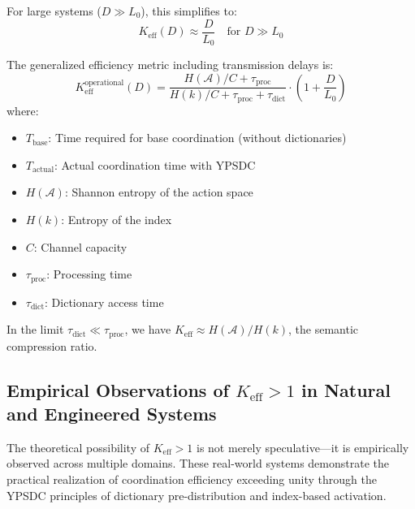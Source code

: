 \documentclass[11pt,a4paper]{article}
\begin{document}
	For large systems ($D \gg L_0$), this simplifies to:
	\begin{equation}
		K_{\mathrm{eff}}(D) \approx \frac{D}{L_0} \quad \text{for } D \gg L_0
	\end{equation}
	
	The generalized efficiency metric including transmission delays is:
	\begin{equation}
		K_{\mathrm{eff}}^{\text{operational}}(D) = \frac{H(\mathcal{A})/C + \tau_{\text{proc}}}{H(k)/C + \tau_{\text{proc}} + \tau_{\text{dict}}} \cdot \left(1 + \frac{D}{L_0}\right)
	\end{equation}
	where:
	\begin{itemize}
		\item $T_{\text{base}}$: Time required for base coordination (without dictionaries)
		\item $T_{\text{actual}}$: Actual coordination time with YPSDC
		\item $H(\mathcal{A})$: Shannon entropy of the action space
		\item $H(k)$: Entropy of the index
		\item $C$: Channel capacity
		\item $\tau_{\text{proc}}$: Processing time
		\item $\tau_{\text{dict}}$: Dictionary access time
	\end{itemize}
	
	In the limit $\tau_{\text{dict}} \ll \tau_{\text{proc}}$, we have $K_{\mathrm{eff}} \approx H(\mathcal{A})/H(k)$, the semantic compression ratio.
	
	\subsection{Empirical Observations of $K_{\mathrm{eff}} > 1$ in Natural and Engineered Systems}
	\label{sec:empirical-keff}
	
	The theoretical possibility of $K_{\mathrm{eff}} > 1$ is not merely speculative---it is empirically observed across multiple domains. These real-world systems demonstrate the practical realization of coordination efficiency exceeding unity through the YPSDC principles of dictionary pre-distribution and index-based activation.
	
\end{document}
